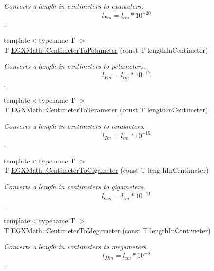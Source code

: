 \begin{DoxyCompactItemize}
\begin{DoxyCompactList}\small\item\em Converts a length in centimeters to exameters. \[ l_{Em}=l_{cm} * 10^{-20} \]. \end{DoxyCompactList}\item 
{\footnotesize template$<$typename T $>$ }\\T \mbox{\hyperlink{group___e_g_x_math-_conversions-_length_conversions-_centimeter-_s_i_ga8fa14e761d09dc55608c28c2101f2d26}{E\+G\+X\+Math\+::\+Centimeter\+To\+Petameter}} (const T length\+In\+Centimeter)
\begin{DoxyCompactList}\small\item\em Converts a length in centimeters to petameters. \[ l_{Pm}=l_{cm} * 10^{-17} \]. \end{DoxyCompactList}\item 
{\footnotesize template$<$typename T $>$ }\\T \mbox{\hyperlink{group___e_g_x_math-_conversions-_length_conversions-_centimeter-_s_i_ga84d4f8159550a726d78bb55e6247e10c}{E\+G\+X\+Math\+::\+Centimeter\+To\+Terameter}} (const T length\+In\+Centimeter)
\begin{DoxyCompactList}\small\item\em Converts a length in centimeters to terameters. \[ l_{Tm}=l_{cm} * 10^{-15} \]. \end{DoxyCompactList}\item 
{\footnotesize template$<$typename T $>$ }\\T \mbox{\hyperlink{group___e_g_x_math-_conversions-_length_conversions-_centimeter-_s_i_gaf3656a809d74231d75f33a9485e4f454}{E\+G\+X\+Math\+::\+Centimeter\+To\+Gigameter}} (const T length\+In\+Centimeter)
\begin{DoxyCompactList}\small\item\em Converts a length in centimeters to gigameters. \[ l_{Gm}=l_{cm} * 10^{-11} \]. \end{DoxyCompactList}\item 
{\footnotesize template$<$typename T $>$ }\\T \mbox{\hyperlink{group___e_g_x_math-_conversions-_length_conversions-_centimeter-_s_i_ga5ba81fb6190e6ce0032410d703d5073b}{E\+G\+X\+Math\+::\+Centimeter\+To\+Megameter}} (const T length\+In\+Centimeter)
\begin{DoxyCompactList}\small\item\em Converts a length in centimeters to megameters. \[ l_{Mm}=l_{cm} * 10^{-8} \]. \end{DoxyCompactList}\item 

\end{DoxyCompactItemize}
